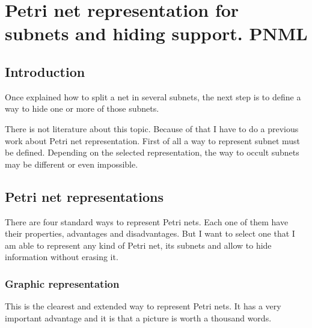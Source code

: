 
\chapter{Petri net representation for subnets and hiding support. PNML} %

\label{Petri net representation for subnets and hiding support. PNML} %


\section{Introduction}

Once explained how to split a net in several subnets, the next step is to define a way to hide one or more of those subnets.

 There is not literature about this
topic. Because of that I have to do a previous work about Petri net representation.
First of all  a way to represent subnet must be defined. Depending on the selected representation, the way to occult subnets may
be different or even impossible.

\section{Petri net representations}
There are four standard ways to represent Petri nets. Each one of them have their
properties, advantages and disadvantages. But I want to select one that I am able to represent any kind of Petri net, its subnets and allow to hide information without erasing it. 

\subsection{Graphic representation}

This is the clearest and extended way to represent Petri nets. It has a
very important advantage and it is that a picture is worth a thousand words.


